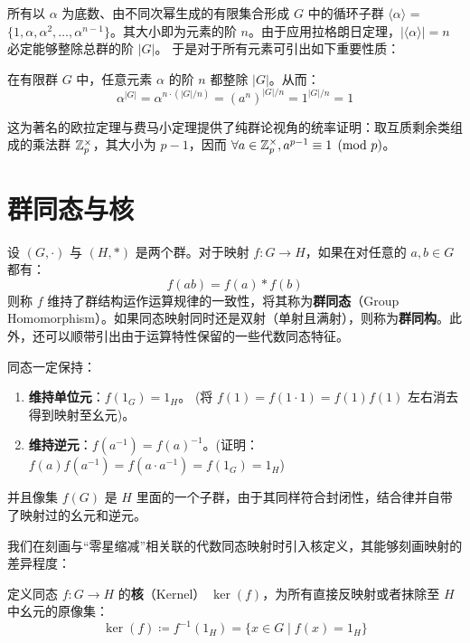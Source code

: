\documentclass[11pt]{article}
\begin{document}
所有以 $\alpha$ 为底数、由不同次幂生成的有限集合形成 $G$ 中的循环子群 $\langle \alpha \rangle$ = $\{1, \alpha, \alpha^2, \dots, \alpha^{n-1}\}$。其大小即为元素的阶 $n$。由于应用拉格朗日定理，$ |\langle \alpha \rangle| = n$ 必定能够整除总群的阶 $|G|$。
于是对于所有元素可引出如下重要性质：
\begin{cncorollary}[元素的阶与其整除性]
    在有限群 $G$ 中，任意元素 $\alpha$ 的阶 $n$ 都整除 $|G|$。从而：
    $$ \alpha^{|G|} = \alpha^{n \cdot (|G|/n)} = (a^n)^{|G|/n} = 1^{|G|/n} = 1 $$
\end{cncorollary}
这为著名的欧拉定理与费马小定理提供了纯群论视角的统率证明：取互质剩余类组成的乘法群 $\mathbb{Z}_p^\times$，其大小为 $p-1$，因而 $\forall a \in \mathbb{Z}_p^\times, a^{p-1} \equiv 1 \pmod p$。

\section{群同态与核}

\begin{cndefinition}[群同态]
    设 $(G, \cdot)$ 与 $(H, *)$ 是两个群。对于映射 $f: G \to H$，如果在对任意的 $a, b \in G$ 都有：
    $$ f(ab) = f(a) * f(b) $$
    则称 $f$ 维持了群结构运作运算规律的一致性，将其称为\textbf{群同态}（Group Homomorphism）。如果同态映射同时还是双射（单射且满射），则称为\textbf{群同构}。此外，还可以顺带引出由于运算特性保留的一些代数同态特征。
\end{cndefinition}

\begin{cnproperty}[群同态的基本保持性]
    同态一定保持：
    \begin{enumerate}
        \item \textbf{维持单位元}：$f(1_G) = 1_H$。 (将 $f(1)=f(1\cdot 1)=f(1)f(1)$ 左右消去得到映射至幺元)。
        \item \textbf{维持逆元}：$f(a^{-1}) = f(a)^{-1}$。(证明： $f(a)f(a^{-1})=f(a\cdot a^{-1})=f(1_G)=1_H$)
    \end{enumerate}
    并且像集 $f(G)$ 是 $H$ 里面的一个子群，由于其同样符合封闭性，结合律并自带了映射过的幺元和逆元。
\end{cnproperty}

我们在刻画与“零星缩减”相关联的代数同态映射时引入核定义，其能够刻画映射的差异程度：

\begin{cndefinition}[同态的核]
    定义同态 $f: G \to H$ 的\textbf{核}（Kernel） $\ker(f)$，为所有直接反映射或者抹除至 $H$ 中幺元的原像集：
    $$ \ker(f) \coloneqq f^{-1}(1_H) = \{x \in G \mid f(x) = 1_H\} $$
\end{cndefinition}
\end{document}
